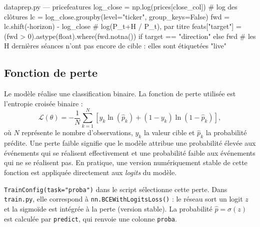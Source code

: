 \documentclass[11pt,a4paper]{article}
\renewcommand{\_}{\usorig\allowbreak}   %
\newcommand{\f}[1]{\texttt{#1}}        %
\begin{document}
\begin{code}{data\_prep.py --- price\_features}
log_close = np.log(prices[close_col])                 # log des clôtures
lc  = log_close.groupby(level="ticker", group_keys=False)
fwd = lc.shift(-horizon) - log_close                  # log(P_{t+H} / P_t), par titre
feats["target"] = (fwd > 0).astype(float).where(fwd.notna()) if target == "direction" else fwd
# les H dernières séances n'ont pas encore de cible : elles sont étiquetées "live"
\end{code}

\subsection{Fonction de perte}\label{sec:perte}
Le modèle réalise une classification binaire. La fonction de perte utilisée est
l'entropie croisée binaire :
\[
  \mathcal{L}(\theta) = -\frac{1}{N}\sum_{k=1}^{N}\left[y_k\ln(\hat p_k) + (1-y_k)\ln(1-\hat p_k)\right],
\]
où $N$ représente le nombre d'observations, $y_k$ la valeur cible et $\hat p_k$ la
probabilité prédite. Une perte faible signifie que le modèle attribue une probabilité
élevée aux événements qui se réalisent effectivement et une probabilité faible aux
événements qui ne se réalisent pas. En pratique, une version numériquement stable de
cette fonction est appliquée directement aux \emph{logits} du modèle.

\begin{danslecode}
\f{TrainConfig(task="proba")} dans le script sélectionne cette perte. Dans \f{train.py},
elle correspond à \f{nn.BCEWithLogitsLoss()} : le réseau sort un logit $z$ et la sigmoïde
est intégrée à la perte (version stable). La probabilité $\hat p = \sigma(z)$ est calculée
par \f{predict}, qui renvoie une colonne \f{proba}.
\end{danslecode}

\end{document}
